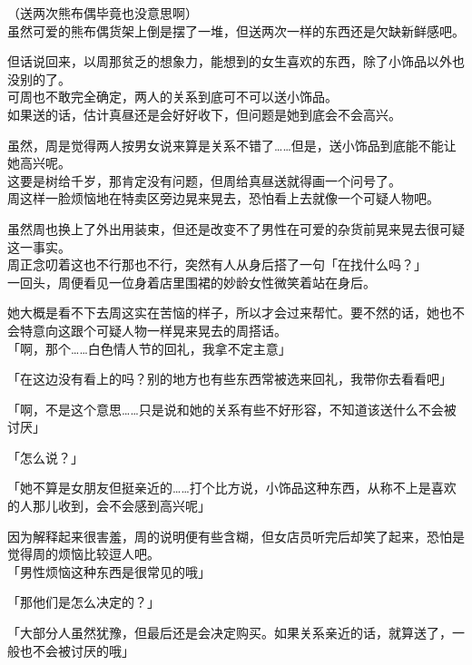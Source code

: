 （送两次熊布偶毕竟也没意思啊）\\

虽然可爱的熊布偶货架上倒是摆了一堆，但送两次一样的东西还是欠缺新鲜感吧。

但话说回来，以周那贫乏的想象力，能想到的女生喜欢的东西，除了小饰品以外也没别的了。\\

可周也不敢完全确定，两人的关系到底可不可以送小饰品。\\

如果送的话，估计真昼还是会好好收下，但问题是她到底会不会高兴。

虽然，周是觉得两人按男女说来算是关系不错了……但是，送小饰品到底能不能让她高兴呢。\\

这要是树给千岁，那肯定没有问题，但周给真昼送就得画一个问号了。\\

周这样一脸烦恼地在特卖区旁边晃来晃去，恐怕看上去就像一个可疑人物吧。

虽然周也换上了外出用装束，但还是改变不了男性在可爱的杂货前晃来晃去很可疑这一事实。\\

周正念叨着这也不行那也不行，突然有人从身后搭了一句「在找什么吗？」\\

一回头，周便看见一位身着店里围裙的妙龄女性微笑着站在身后。

她大概是看不下去周这实在苦恼的样子，所以才会过来帮忙。要不然的话，她也不会特意向这跟个可疑人物一样晃来晃去的周搭话。\\

「啊，那个……白色情人节的回礼，我拿不定主意」

「在这边没有看上的吗？别的地方也有些东西常被选来回礼，我带你去看看吧」

「啊，不是这个意思……只是说和她的关系有些不好形容，不知道该送什么不会被讨厌」

「怎么说？」

「她不算是女朋友但挺亲近的……打个比方说，小饰品这种东西，从称不上是喜欢的人那儿收到，会不会感到高兴呢」

因为解释起来很害羞，周的说明便有些含糊，但女店员听完后却笑了起来，恐怕是觉得周的烦恼比较逗人吧。\\

「男性烦恼这种东西是很常见的哦」

「那他们是怎么决定的？」

「大部分人虽然犹豫，但最后还是会决定购买。如果关系亲近的话，就算送了，一般也不会被讨厌的哦」\\

